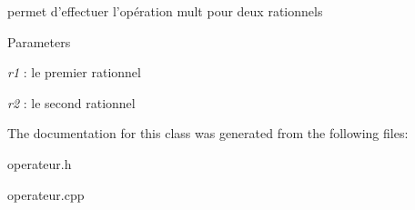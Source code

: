 permet d'effectuer l'opération mult pour deux rationnels 


\begin{DoxyParams}{Parameters}
\item[{\em r1}]: le premier rationnel \item[{\em r2}]: le second rationnel \end{DoxyParams}


The documentation for this class was generated from the following files:\begin{DoxyCompactItemize}
\item 
operateur.h\item 
operateur.cpp\end{DoxyCompactItemize}
